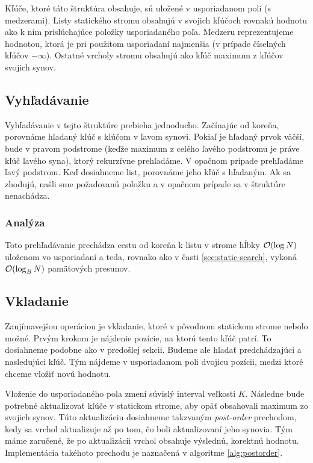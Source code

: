 Kľúče, ktoré táto štruktúra obsahuje, sú uložené v usporiadanom poli (s medzerami). Listy statického stromu obsahujú v svojich kľúčoch rovnakú hodnotu ako k ním prislúchajúce položky usporiadaného poľa. Medzeru reprezentujeme hodnotou, ktorá je pri použitom usporiadaní najmenšia (v prípade číselných kľúčov $-\infty$). Ostatné vrcholy stromu obsahujú ako kľúč maximum z kľúčov svojich synov.

\subsection{Vyhľadávanie} \label{sec:dynamic-obliv-search}
Vyhľadávanie v tejto štruktúre prebieha jednoducho. Začínajúc od koreňa, porovnáme hľadaný kľúč s kľúčom v ľavom synovi. Pokiaľ je hľadaný prvok väčší, bude v pravom podstrome (keďže maximum z celého ľavého podstromu je práve kľúč ľavého syna), ktorý rekurzívne prehľadáme. V opačnom prípade prehľadáme ľavý podstrom. Keď dosiahneme list, porovnáme jeho kľúč s hľadaným. Ak sa zhodujú, našli sme požadovanú položku a v opačnom prípade sa v štruktúre nenachádza.

\subsubsection{Analýza}

Toto prehľadávanie prechádza cestu od koreňa k listu v strome hĺbky $\mathcal{O}(\log{N})$ uloženom vo  usporiadaní a teda, rovnako ako v časti \ref{sec:static-search}, vykoná $\mathcal{O}(\log_B{N})$ pamäťových presunov.

\subsection{Vkladanie}
Zaujímavejšou operáciou je vkladanie, ktoré v pôvodnom statickom strome nebolo možné. Prvým krokom je nájdenie pozície, na ktorú tento kľúč patrí. To dosiahneme podobne ako v predošlej sekcii. Budeme ale hľadať predchádzajúci a nasledujúci kľúč. Tým nájdeme v usporiadanom poli dvojicu pozícii, medzi ktoré chceme vložiť novú hodnotu.

Vloženie do usporiadaného pola zmení súvislý interval veľkosti $K$. Následne bude potrebné aktualizovať kľúče v statickom strome, aby opäť obsahovali maximum zo svojich synov. Túto aktualizáciu dosiahneme takzvaným \emph{post-order} prechodom, kedy sa vrchol aktualizuje až po tom, čo boli aktualizovaní jeho synovia. Tým máme zaručené, že po aktualizácii vrchol obsahuje výslednú, korektnú hodnotu. Implementácia takéhoto prechodu je naznačená v algoritme \ref{alg:postorder}.

